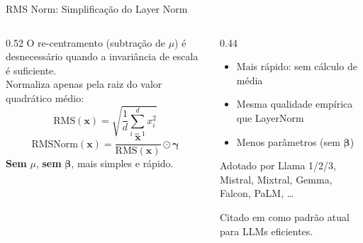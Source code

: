 \documentclass[aspectratio=169, xcolor=dvipsnames]{beamer}
\begin{document}
  \begin{frame}{RMS Norm: Simplificação do Layer Norm\footnotemark[1]}
    \begin{columns}[T]
      \begin{column}{0.52\textwidth}
        O re-centramento (subtração de $\mu$) é desnecessário quando a invariância de escala é suficiente.\\[0.4em]
        Normaliza apenas pela raiz do valor quadrático médio:
        \[
          \text{RMS}(\mathbf{x}) = \sqrt{\frac{1}{d}\sum_{i=1}^d x_i^2}
        \]
        \[
          \text{RMSNorm}(\mathbf{x}) = \frac{\mathbf{x}}{\text{RMS}(\mathbf{x})} \odot \boldsymbol{\gamma}
        \]
        \textbf{Sem} $\mu$, \textbf{sem} $\boldsymbol{\beta}$, mais simples e rápido.
      \end{column}
      \begin{column}{0.44\textwidth}
        \begin{itemize}
          \item Mais rápido: sem cálculo de média
          \item Mesma qualidade empírica que LayerNorm
          \item Menos parâmetros (sem $\boldsymbol{\beta}$)
        \end{itemize}
        \vspace{0.3em}
        \begin{exampleblock}{Adotado por}
          Llama 1/2/3, Mistral, Mixtral, Gemma, Falcon, PaLM, \ldots
        \end{exampleblock}
        \vspace{0.2em}
        Citado em \cite{stanfordcme295} como padrão atual para LLMs eficientes.
      \end{column}
    \end{columns}
  \end{frame}
\end{document}
